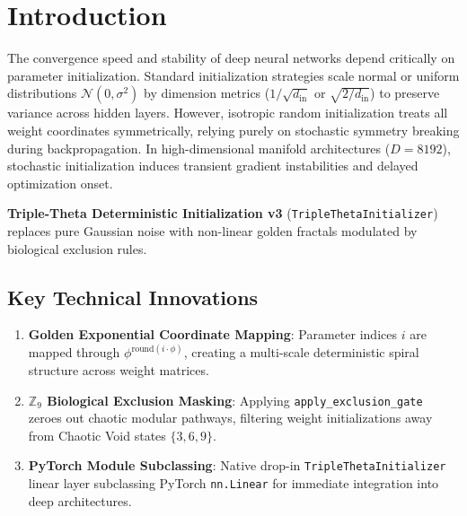 \section{Introduction}
The convergence speed and stability of deep neural networks depend critically on parameter initialization. Standard initialization strategies scale normal or uniform distributions $\mathcal{N}(0, \sigma^2)$ by dimension metrics ($1/\sqrt{d_{\text{in}}}$ or $\sqrt{2/d_{\text{in}}}$) to preserve variance across hidden layers. However, isotropic random initialization treats all weight coordinates symmetrically, relying purely on stochastic symmetry breaking during backpropagation. In high-dimensional manifold architectures ($D = 8192$), stochastic initialization induces transient gradient instabilities and delayed optimization onset.

\textbf{Triple-Theta Deterministic Initialization v3} (\texttt{TripleThetaInitializer}) replaces pure Gaussian noise with non-linear golden fractals modulated by biological exclusion rules.

\subsection{Key Technical Innovations}
\begin{enumerate}[label=\textbf{\arabic*.}]
    \item \textbf{Golden Exponential Coordinate Mapping}: Parameter indices $i$ are mapped through $\phi^{\text{round}(i \cdot \phi)}$, creating a multi-scale deterministic spiral structure across weight matrices.
    \item \textbf{$\mathbb{Z}_9$ Biological Exclusion Masking}: Applying \texttt{apply\_exclusion\_gate} zeroes out chaotic modular pathways, filtering weight initializations away from Chaotic Void states $\{3, 6, 9\}$.
    \item \textbf{PyTorch Module Subclassing}: Native drop-in \texttt{TripleThetaInitializer} linear layer subclassing PyTorch \texttt{nn.Linear} for immediate integration into deep architectures.
\end{enumerate}
